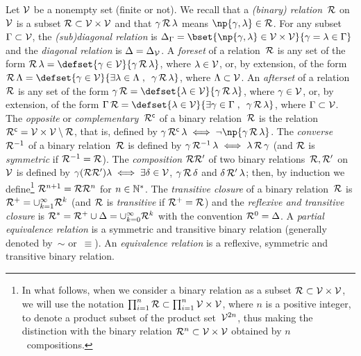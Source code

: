 \documentclass[12pt]{article}
\begin{document}
Let ${\cal V}$ be a nonempty set (finite or not). 
We recall that a \emph{(binary) relation}~$\mathcal{R}$ on~${\cal V}$ is
a subset $\mathcal{R} \subset {\cal V}\times{\cal V} $ and that 
\( \gamma\, \mathcal{R}\, \lambda \) means 
\( \np{\bgent,\cgent} \in \relation \).
For any subset \( \Gamma \subset {\cal V} \), 
the \emph{(sub)diagonal relation} is \( \Delta_{\Bgent} = \bset{ \np{\bgent,\cgent} \in \AGENT\times\AGENT }%
{ \bgent=\cgent \in \Bgent } \)
and the \emph{diagonal relation} is \( \Delta=\Delta_{{\cal V}} \).
%
A \emph{foreset} of a relation~$\mathcal{R}$ is
any set of the form \( \relation \, \cgent = 
\defset{ \bgent \in  \AGENT }{ \bgent\, \relation \, \cgent } \),
where \( \lambda \in {\cal V} \), 
or, by extension, of the form \( \relation \, \Cgent = 
\defset{ \bgent \in  \AGENT }{ \exists \cgent \in \Cgent \eqsepv \bgent\,
  \relation \, \cgent } \), where \( \Lambda \subset {\cal V} \).
%
An \emph{afterset} of a relation~$\mathcal{R}$ is
any set of the form \( \bgent \, \relation = 
\defset{ \cgent \in  \AGENT }{ \bgent\, \relation \, \cgent } \),
where \( \gamma \in {\cal V} \), 
or, by extension, of the form \( \Bgent \, \relation = 
\defset{ \cgent \in  \AGENT }{ \exists \bgent \in \Bgent \eqsepv \bgent\,
  \relation \, \cgent } \), where \( \Gamma \subset {\cal V} \).
%
The \emph{opposite} or \emph{complementary~$\mathcal{R}^{\mathsf{c}}$} of a binary
relation~$\mathcal{R}$ is the relation~$\mathcal{R}^{\mathsf{c}}={\cal V}\times{\cal V}\setminus\mathcal{R}$,
that is, defined by \( \bgent\, \relation^{\mathsf{c}} \, \cgent \iff 
\neg \np{ \bgent\, \relation \, \cgent } \).
The \emph{converse~$\mathcal{R}^{-1}$} of a binary relation~$\mathcal{R}$ is
defined by \( \gamma\, \mathcal{R}^{-1} \, \lambda \iff \lambda\, \mathcal{R} \, \gamma
\) (and $\mathcal{R}$ is  \emph{symmetric} if \( \mathcal{R}^{-1}=\mathcal{R} \)).
The \emph{composition}
$\mathcal{R}\mathcal{R}'$ of two
binary relations~$\mathcal{R}, \mathcal{R}'$ on~${\cal V}$ is defined by
\( \gamma (\mathcal{R}\mathcal{R}') \lambda \iff
\exists \delta \in  {\cal V} \), \( \gamma\, \mathcal{R} \, \delta \)
and \( \delta\, \mathcal{R}' \, \lambda \);
then, by induction we define\footnote{%
  In what follows, when we consider a binary relation
  as a subset $\mathcal{R} \subset {\cal V}\times{\cal V} $, we will use the notation
  \( \prod_{i=1}^{n} \mathcal{R} \subset \prod_{i=1}^{n} {\cal V}\times{\cal V}\), where $n$ is
  a positive integer, to
  denote a product subset of the product set~\( {\cal V}^{2n} \),
  thus making the distinction with the binary relation
  $\mathcal{R}^{n} \subset {\cal V}\times{\cal V} $ obtained by $n$~compositions.}
\( \mathcal{R}^{n+1}=\mathcal{R}\mathcal{R}^{n} \) for \( n \in {\mathbb N}^* \). 
The \emph{transitive closure} of a binary relation~$\mathcal{R}$ is
\( \mathcal{R}^{+} = \cup_{k=1}^{\infty} \mathcal{R}^{k} \)
(and $\mathcal{R}$ is  \emph{transitive} if \( \mathcal{R}^{+}=\mathcal{R} \))
and the \emph{reflexive and transitive closure} is 
\( \mathcal{R}^{*}= \mathcal{R}^{+} \cup
\Delta = \cup_{k=0}^{\infty} \mathcal{R}^{k} \) with the convention $\mathcal{R}^0=\Delta$. 
% 
A \emph{partial equivalence relation} is a symmetric and transitive binary
relation (generally denoted by~$\sim$ or~$\equiv$).
An \emph{equivalence relation} is a reflexive, symmetric and transitive binary
relation.
\bigskip
\end{document}
